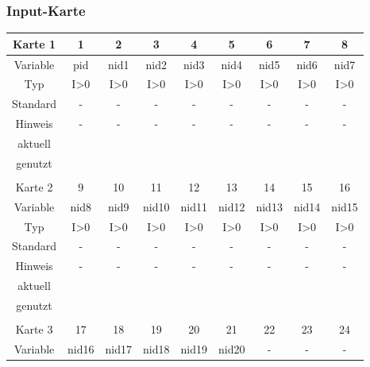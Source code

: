 \documentclass[11pt,titlepage,listof=totoc,bibliography=totoc,twoside]{scrreprt}
\begin{document}
{{\subsubsection{Input-Karte}
%
\begin{table}[htbp]
\centering
\begin{tabularx}{\textwidth}{cCCCCCCCC}
\toprule
Karte 1         & 1     & 2     & 3     & 4     & 5     & 6     & 7     & 8       \\
\midrule
Variable        & pid   & nid1  & nid2  & nid3  & nid4  & nid5  & nid6  & nid7    \\
Typ             & I>0   & I>0   & I>0   & I>0   & I>0   & I>0   & I>0   & I>0     \\
Standard        & -     & -     & -     & -     & -     & -     & -     & -       \\
Hinweis         & -     & -     & -     & -     & -     & -     & -     & -       \\
aktuell         &  &  &  &  &  &  &  &   \\
genutzt \\
\\
Karte 2         & 9     & 10    & 11    & 12    & 13    & 14    & 15    & 16      \\
\midrule
Variable        & nid8  & nid9  & nid10 & nid11 & nid12 & nid13 & nid14 & nid15   \\
Typ             & I>0   & I>0   & I>0   & I>0   & I>0   & I>0   & I>0   & I>0     \\
Standard        & -     & -     & -     & -     & -     & -     & -     & -       \\
Hinweis         & -     & -     & -     & -     & -     & -     & -     & -       \\
aktuell         &  &  &  &  &  &  &  &   \\
genutzt \\
\\
Karte 3         & 17    & 18    & 19    & 20    & 21    & 22    & 23    & 24      \\
\midrule
Variable        & nid16 & nid17 & nid18 & nid19 & nid20 & -  & -  & -   \\

\end{tabularx}
\end{table}}}
\end{document}
